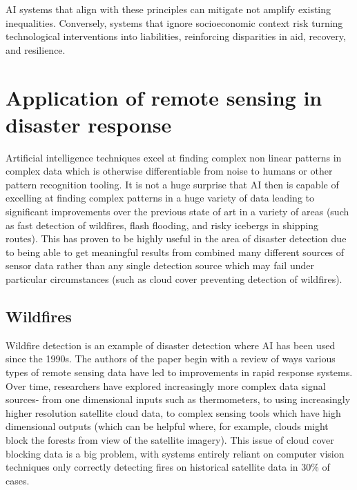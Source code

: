 \documentclass[conference,a4paper]{IEEEtran}
\begin{document}
AI systems that align with these principles can mitigate not amplify existing inequalities. Conversely, systems that ignore socioeconomic context risk turning technological interventions into liabilities, reinforcing disparities in aid, recovery, and resilience.


\section{Application of remote sensing in disaster response}


Artificial intelligence techniques excel at finding complex non linear patterns in complex data which is otherwise differentiable from noise to humans or other pattern recognition tooling. It is not a huge surprise that AI then is capable of excelling at finding complex patterns in a huge variety of data leading to significant improvements over the previous state of art in a variety of areas (such as fast detection of wildfires, flash flooding, and risky icebergs in shipping routes). This has proven to be highly useful in the area of disaster detection due to being able to get meaningful results from combined many different sources of sensor data rather than any single detection source which may fail under particular circumstances (such as cloud cover preventing detection of wildfires).


\subsection{Wildfires}

Wildfire detection is an example of disaster detection where AI has been used since the 1990s. The authors of the paper begin with a review of ways various types of remote sensing data have led to improvements in rapid response systems. Over time, researchers have explored increasingly more complex data signal sources- from one dimensional inputs such as thermometers, to using increasingly higher resolution satellite cloud data, to complex sensing tools which have high dimensional outputs (which can be helpful where, for example, clouds might block the forests from view of the satellite imagery). This issue of cloud cover blocking data is a big problem, with systems entirely reliant on computer vision techniques only correctly detecting fires on historical satellite data in 30\% of cases.
\end{document}

